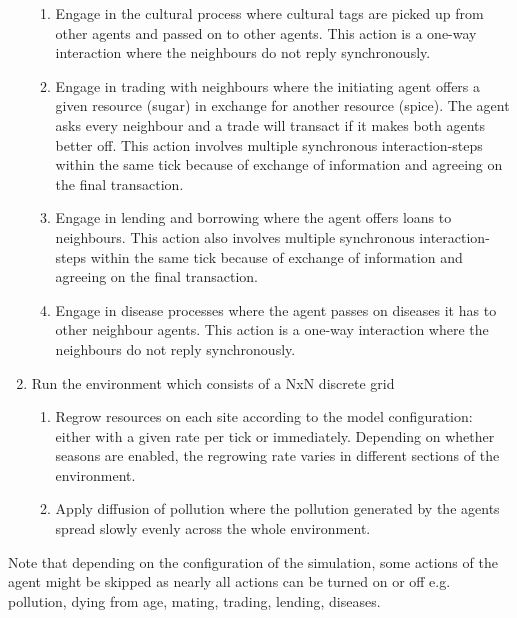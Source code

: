 \begin{enumerate}
\begin{enumerate}
		\item Engage in the cultural process where cultural tags are picked up from other agents and passed on to other agents. This action is a one-way interaction where the neighbours do not reply synchronously.
		
		\item Engage in trading with neighbours where the initiating agent offers a given resource (sugar) in exchange for another resource (spice). The agent asks every neighbour and a trade will transact if it makes both agents better off. This action involves multiple synchronous interaction-steps within the same tick because of exchange of information and agreeing on the final transaction.
		
		\item Engage in lending and borrowing where the agent offers loans to neighbours. This action also involves multiple synchronous interaction-steps within the same tick because of exchange of information and agreeing on the final transaction.
		
		\item Engage in disease processes where the agent passes on diseases it has to other neighbour agents. This action is a one-way interaction where the neighbours do not reply synchronously.
	\end{enumerate}
		
	\item Run the environment which consists of a NxN discrete grid
		\begin{enumerate}
			\item Regrow resources on each site according to the model configuration: either with a given rate per tick or immediately. Depending on whether seasons are enabled, the regrowing rate varies in different sections of the environment.
			\item Apply diffusion of pollution where the pollution generated by the agents spread slowly evenly across the whole environment.
		\end{enumerate}
\end{enumerate}

Note that depending on the configuration of the simulation, some actions of the agent might be skipped as nearly all actions can be turned on or off e.g. pollution, dying from age, mating, trading, lending, diseases.